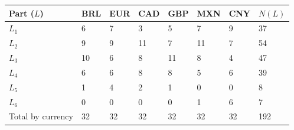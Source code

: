 \begin{tabular}{llllllll} \toprule
Part  ($L$)&BRL& EUR& CAD& GBP& MXN& CNY& $N(L)$\\ \midrule
$L_{1}$ &6& 7& 3& 5& 7& 9& 37\\
$L_{2}$ &9& 9& 11& 7& 11& 7& 54\\
$L_{3}$ &10& 6& 8& 11& 8& 4& 47\\
$L_{4}$ &6& 6& 8& 8& 5& 6& 39\\
$L_{5}$ &1& 4& 2& 1& 0& 0& 8\\
$L_{6}$ &0& 0& 0& 0& 1& 6& 7\\
\midrule
Total  by currency&32& 32& 32& 32& 32& 32& 192\\
\bottomrule
\end{tabular}
